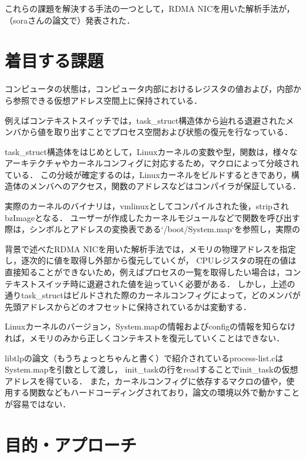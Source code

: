 
これらの課題を解決する手法の一つとして，RDMA NICを用いた解析手法が，（soraさんの論文で）発表された．

\section{着目する課題}

コンピュータの状態は，コンピュータ内部におけるレジスタの値および，内部から参照できる仮想アドレス空間上に保持されている．

例えばコンテキストスイッチでは，task_struct構造体から辿れる退避されたメンバから値を取り出すことでプロセス空間および状態の復元を行なっている．

task_struct構造体をはじめとして，Linuxカーネルの変数や型，関数は，様々なアーキテクチャやカーネルコンフィグに対応するため，マクロによって分岐されている．
この分岐が確定するのは，Linuxカーネルをビルドするときであり，構造体のメンバへのアクセス，関数のアドレスなどはコンパイラが保証している．

実際のカーネルのバイナリは，vmlinuxとしてコンパイルされた後，stripされbzImageとなる．
ユーザーが作成したカーネルモジュールなどで関数を呼び出す際は，シンボルとアドレスの変換表である`/boot/System.map`を参照し，実際の

背景で述べたRDMA NICを用いた解析手法では，メモリの物理アドレスを指定し，逐次的に値を取得し外部から復元していくが，
CPUレジスタの現在の値は直接知ることができないため，例えばプロセスの一覧を取得したい場合は，コンテキストスイッチ時に退避された値を辿っていく必要がある．
しかし，上述の通りtask_structはビルドされた際のカーネルコンフィグによって，どのメンバが先頭アドレスからどのオフセットに保持されているかは変動する．

Linuxカーネルのバージョン，System.mapの情報およびconfigの情報を知らなければ，メモリのみから正しくコンテキストを復元していくことはできない．

libtlpの論文（もうちょっとちゃんと書く）で紹介されているprocess-list.cはSystem.mapを引数として渡し，
init_taskの行をreadすることでinit_taskの仮想アドレスを得ている．
また，カーネルコンフィグに依存するマクロの値や，使用する関数などもハードコーディングされており，論文の環境以外で動かすことが容易ではない．

\section{目的・アプローチ}

